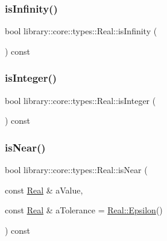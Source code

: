 \mbox{\label{classlibrary_1_1core_1_1types_1_1_real_a4603222d9315aa59355778d66c0b214d}} 
\subsubsection{\texorpdfstring{is\+Infinity()}{isInfinity()}}
{\footnotesize\ttfamily bool library\+::core\+::types\+::\+Real\+::is\+Infinity (\begin{DoxyParamCaption}{ }\end{DoxyParamCaption}) const}

\mbox{\label{classlibrary_1_1core_1_1types_1_1_real_ad2709f64d24cb119403a0a6d386f5eda}} 
\subsubsection{\texorpdfstring{is\+Integer()}{isInteger()}}
{\footnotesize\ttfamily bool library\+::core\+::types\+::\+Real\+::is\+Integer (\begin{DoxyParamCaption}{ }\end{DoxyParamCaption}) const}

\mbox{\label{classlibrary_1_1core_1_1types_1_1_real_a59cda3a7c738f0d0244e408dadeb079c}} 
\subsubsection{\texorpdfstring{is\+Near()}{isNear()}}
{\footnotesize\ttfamily bool library\+::core\+::types\+::\+Real\+::is\+Near (\begin{DoxyParamCaption}\item[{const \hyperlink{classlibrary_1_1core_1_1types_1_1_real}{Real} \&}]{a\+Value,  }\item[{const \hyperlink{classlibrary_1_1core_1_1types_1_1_real}{Real} \&}]{a\+Tolerance = {\ttfamily \hyperlink{classlibrary_1_1core_1_1types_1_1_real_a5f3b76a5055cb042c25448b873e39663}{Real\+::\+Epsilon}()} }\end{DoxyParamCaption}) const}

